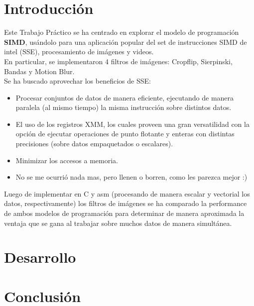 \documentclass[spanish,a4paper]{article}
\begin{document}
\subtitulo{}

\fecha{\today}

\grupo{}


\maketitle

\section{Introducci\'{o}n}

Este Trabajo Pr\'{a}ctico se ha centrado en explorar el modelo de programaci\'{o}n \textbf{SIMD}, us\'{a}ndolo para una aplicaci\'{o}n popular del set de instrucciones SIMD de intel (SSE), procesamiento de im\'{a}genes y videos.\\
En particular, se implementaron 4 filtros de im\'{a}genes: Cropflip, Sierpinski, Bandas y Motion Blur.\\

Se ha buscado aprovechar los beneficios de SSE: 

\begin{itemize}

	\item Procesar conjuntos de datos de manera eficiente, ejecutando de manera paralela (al mismo tiempo) la misma instrucci\'{o}n sobre distintos datos.
	
	\item El uso de los registros XMM, los cuales proveen una gran versatilidad con la opci\'{o}n de ejecutar operaciones de punto flotante y enteras con distintas precisiones (sobre datos empaquetados o escalares).

	\item Minimizar los accesos a memoria.
	
	\item No se me ocurri\'{o} nada mas, pero llenen o borren, como les parezca mejor :)

\end{itemize} 
Luego de implementar en C y asm (procesando de manera escalar y vectorial los datos, respectivamente) los filtros de im\'{a}genes se ha comparado la performance de ambos modelos de programaci\'{o}n para determinar de manera aproximada la ventaja que se gana al trabajar sobre muchos datos de manera simult\'{a}nea.

\newpage

\section{Desarrollo}


\newpage
\section{Conclusi\'{o}n}
\end{document}
